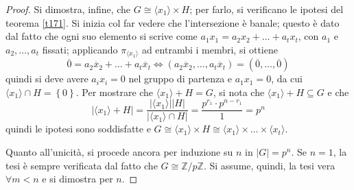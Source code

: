 \documentclass[12pt]{scrartcl}
\theoremstyle{style}
\numberwithin{equation}{subsection}
\begin{document}
\begin{proof}
Si dimostra, infine, che $G \cong \langle x_1  \rangle\times H $; per farlo, si verificano le ipotesi del teorema \ref{t171}.
Si inizia col far vedere che l'intersezione \`e banale; questo \`e dato dal fatto che ogni suo elemento si scrive come $a_1x_1 = a_2x_2+ \ldots + a_t x_t$, con $a_1$ e $a_2,\ldots,a_t$ fissati; applicando $\pi_{\langle x_1 \rangle} $ ad entrambi i membri, si ottiene
\[
\overline{0} = a_2 \overline{x}_2 + \ldots + a_t \overline{x}_t \iff (a_2 \overline{x}_2,\ldots, a_t \overline{x}_t) = (\overline{0},\ldots,\overline{0})
\] 
quindi si deve avere $a_ix_i = 0$ nel gruppo di partenza e $a_1 x_1=0$, da cui $\langle x_1 \rangle\cap H = \left\{ 0 \right\} $.
Per  mostrare che $\langle x_1 \rangle+  H = G$, si nota che $\langle x_1 \rangle+ H \subseteq G$ e che
\[
\lvert \langle x_1 \rangle+ H  \rvert = \frac{\lvert \langle x_1 \rangle \rvert \lvert H \rvert }{\lvert \langle x_1 \rangle \cap H\rvert } = \frac{p^{r_1} \cdot p^{n-r_1} }{1}=p^n
\] 
quindi le ipotesi sono soddisfatte e $G \cong \langle x_1 \rangle\times H \cong \langle x_1 \rangle \times  \ldots \times\langle x_t \rangle $.

Quanto all'unicit\`a, si procede ancora per induzione su $n$ in $\lvert G \rvert  = p^n$.
Se $n=1$, la tesi \`e sempre verificata dal fatto che $G \cong \mathbb{Z} / p\mathbb{Z}$.
Si assume, quindi, la tesi vera $\forall m < n$ e si dimostra per $n$.


\end{proof}
\end{document}
